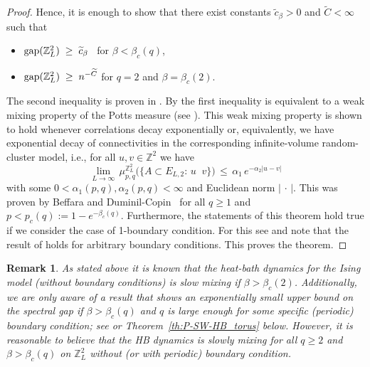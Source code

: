 \documentclass{dis}
\newtheorem{remark}[theorem]{Remark}
\theoremstyle{citing}
\begin{document}
\begin{proof}
Hence, it is enough to show that there exist constants 
${\widetilde{{c}}}_\beta>0$ and ${\widetilde{{C}}}<\infty$ such that 
\begin{itemize}
\item\quad ${\rm gap}({\ensuremath{\mathbb{Z}}}^2_L) \;\ge\; {\widetilde{{c}}}_\beta$ 
			\qquad\, for $\beta < \beta_c(q)$,\vspace{1mm}
\item\quad ${\rm gap}({\ensuremath{\mathbb{Z}}}^2_L) \;\ge\; n^{-{\widetilde{{C}}}}$ 
			\quad\; for $q=2$ and $\beta = \beta_c(2)$.
\end{itemize}
The second inequality is proven in \cite[Thm.~4.2]{LS}. 
By \cite[Thm.~3.2]{MOS} the first inequality is equivalent to 
a weak mixing property of the Potts measure 
(see \cite[eq.~(1.11)]{MOS}). 
This weak mixing property is shown \cite[Thm.~3.6]{A} to hold 
whenever correlations 
decay exponentially or, equivalently, we have exponential decay 
of connectivities in the corresponding infinite-volume 
random-cluster model, i.e., for all $u,v\in {\ensuremath{\mathbb{Z}}}^2$ we have 
\[
\lim_{L\to\infty}\,\mu_{p,q}^{{\ensuremath{\mathbb{Z}}}_L^2}
	\bigl(\{A\subset E_{L,2}:\, u{\mathop{\stackrel{{A}}{\leftrightarrow}}}v\}\bigr) 
\,\le\, {\alpha}_1\, e^{-{\alpha}_2 {\left\vert {u-v} \right\vert}}
\]
with some $0<{\alpha}_1(p,q),{\alpha}_2(p,q)<\infty$ 
and Euclidean norm ${\left\vert {\,\cdot\,} \right\vert}$.
This was proven by Beffara and Duminil-Copin~\cite[Thm.~2]{BDC} 
for all $q\ge1$ and $p<p_c(q):=1-e^{-\beta_c(q)}$. 
Furthermore, the statements of this theorem hold true if we consider 
the case of \mbox{1-boundary} condition. For this see 
\cite[Thm.~1]{LS} and note that the result of \cite[Thm.~3.2]{MOS} 
holds for arbitrary boundary conditions. This proves the theorem.
\end{proof}

\begin{remark}
As stated above it is known that the heat-bath dynamics 
for the Ising model (without boundary conditions) is slow mixing 
if $\beta>\beta_c(2)$. Additionally, we are only aware of a result 
that shows an exponentially small upper bound on the spectral gap 
if $\beta>\beta_c(q)$ and $q$ is large enough for some specific 
(periodic) boundary condition; 
see \cite[Thm.~1.2]{BCT} or Theorem~\ref{th:P-SW-HB_torus} below. 
However, it is reasonable to believe that the HB dynamics is slowly 
mixing for all $q\ge2$ and $\beta>\beta_c(q)$ on ${\ensuremath{\mathbb{Z}}}_L^2$ 
without (or with periodic) boundary condition.
\end{remark}
\end{document}
